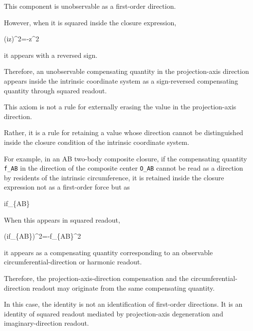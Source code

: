 \documentclass[
  a4paper,
]{article}
\newenvironment{Shaded}{}{}
\newcommand{\NormalTok}[1]{#1}
\begin{document}
This component is unobservable as a first-order direction.

However, when it is squared inside the closure expression,

\begin{Shaded}
\begin{Highlighting}[]
\NormalTok{(iz)\^{}2={-}z\^{}2}
\end{Highlighting}
\end{Shaded}

it appears with a reversed sign.

Therefore, an unobservable compensating quantity in the projection-axis
direction appears inside the intrinsic coordinate system as a
sign-reversed compensating quantity through squared readout.

This axiom is not a rule for externally erasing the value in the
projection-axis direction.

Rather, it is a rule for retaining a value whose direction cannot be
distinguished inside the closure condition of the intrinsic coordinate
system.

For example, in an AB two-body composite closure, if the compensating
quantity \texttt{f\_AB} in the direction of the composite center
\texttt{O\_AB} cannot be read as a direction by residents of the
intrinsic circumference, it is retained inside the closure expression
not as a first-order force but as

\begin{Shaded}
\begin{Highlighting}[]
\NormalTok{if\_\{AB\}}
\end{Highlighting}
\end{Shaded}

When this appears in squared readout,

\begin{Shaded}
\begin{Highlighting}[]
\NormalTok{(if\_\{AB\})\^{}2={-}f\_\{AB\}\^{}2}
\end{Highlighting}
\end{Shaded}

it appears as a compensating quantity corresponding to an observable
circumferential-direction or harmonic readout.

Therefore, the projection-axis-direction compensation and the
circumferential-direction readout may originate from the same
compensating quantity.

In this case, the identity is not an identification of first-order
directions. It is an identity of squared readout mediated by
projection-axis degeneration and imaginary-direction readout.
\end{document}
